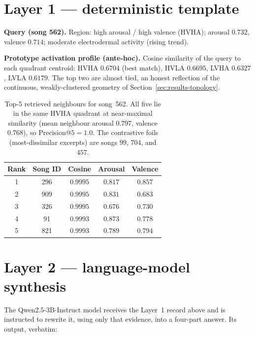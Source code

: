 \documentclass[12pt]{report}
\begin{document}
\section*{Layer 1 --- deterministic template}

\noindent\textbf{Query (song 562).} Region: high arousal / high valence (HVHA); arousal $0.732$, valence $0.714$; moderate electrodermal activity (rising trend).

\noindent\textbf{Prototype activation profile (ante-hoc).} Cosine similarity of the query to each quadrant centroid: HVHA $0.6704$ (best match), HVLA $0.6695$, LVHA $0.6327$, LVLA $0.6179$. The top two are almost tied, an honest reflection of the continuous, weakly-clustered geometry of Section~\ref{sec:results-topology}.

\begin{table}[ht]
\centering
\small
\begin{tabular}{c c c c c}
\toprule
\textbf{Rank} & \textbf{Song ID} & \textbf{Cosine} & \textbf{Arousal} & \textbf{Valence} \\
\midrule
1 & 296 & $0.9995$ & $0.817$ & $0.857$ \\
2 & 909 & $0.9995$ & $0.831$ & $0.683$ \\
3 & 326 & $0.9995$ & $0.676$ & $0.730$ \\
4 & 91  & $0.9993$ & $0.873$ & $0.778$ \\
5 & 821 & $0.9993$ & $0.789$ & $0.794$ \\
\bottomrule
\end{tabular}
\caption{Top-5 retrieved neighbours for song~562. All five lie in the same HVHA quadrant at near-maximal similarity (mean neighbour arousal $0.797$, valence $0.768$), so Precision@$5=1.0$. The contrastive foils (most-dissimilar excerpts) are songs $99$, $704$, and $457$.}
\label{tab:worked-top5}
\end{table}

\section*{Layer 2 --- language-model synthesis}

The Qwen2.5-3B-Instruct model receives the Layer~1 record above and is instructed to rewrite it, using only that evidence, into a four-part answer. Its output, verbatim:
\end{document}
